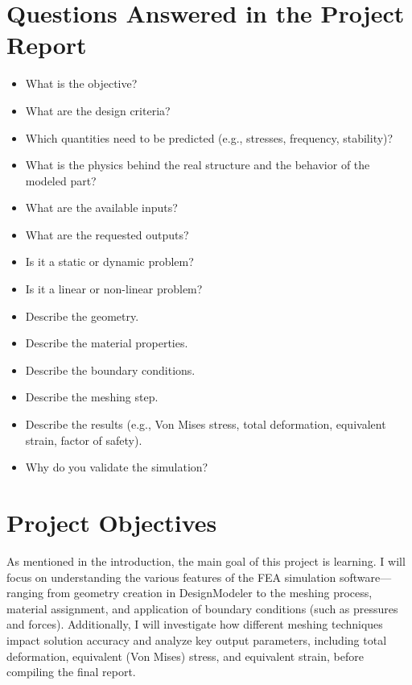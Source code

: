 \documentclass[12pt, a4paper]{article}
\begin{document}
	\section{Questions Answered in the Project Report}
	\begin{itemize}
		\item What is the objective?
		\item What are the design criteria?
		\item Which quantities need to be predicted (e.g., stresses, frequency, stability)?
		\item What is the physics behind the real structure and the behavior of the modeled part?
		\item What are the available inputs?
		\item What are the requested outputs?
		\item Is it a static or dynamic problem?
		\item Is it a linear or non-linear problem?
		\item Describe the geometry.
		\item Describe the material properties.
		\item Describe the boundary conditions.
		\item Describe the meshing step.
		\item Describe the results (e.g., Von Mises stress, total deformation, equivalent strain, factor of safety).
		\item Why do you validate the simulation?
	\end{itemize}
	
	
	\section{Project Objectives}
	
	As mentioned in the introduction, the main goal of this project is learning. I will focus on understanding the various features of the FEA simulation software—ranging from geometry creation in DesignModeler to the meshing process, material assignment, and application of boundary conditions (such as pressures and forces). Additionally, I will investigate how different meshing techniques impact solution accuracy and analyze key output parameters, including total deformation, equivalent (Von Mises) stress, and equivalent strain, before compiling the final report.
	
\end{document}
